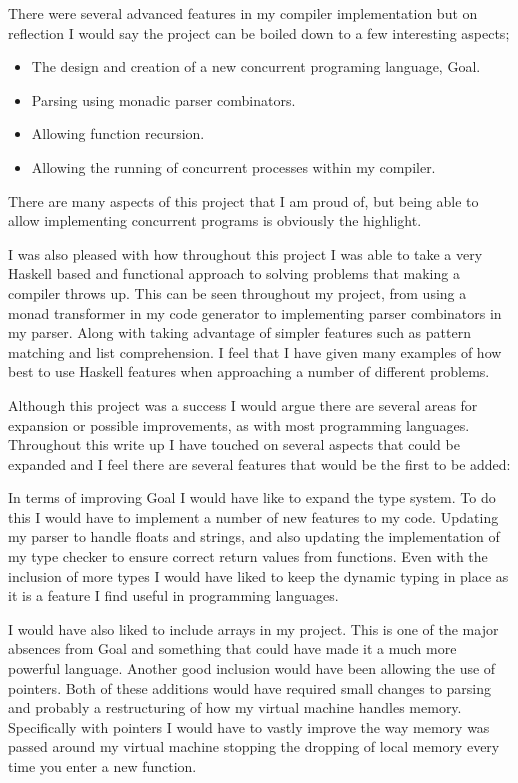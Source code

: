 There were several advanced features in my compiler implementation but on reflection I would say the project can be boiled down to a few interesting aspects;

\begin{itemize}
\item The design and creation of a new concurrent programing language, Goal.
\item Parsing using monadic parser combinators.
\item Allowing function recursion. 
\item Allowing the running of concurrent processes within my compiler.
\end{itemize}

There are many aspects of this project that I am proud of, but being able to allow implementing concurrent programs is obviously the highlight. 

I was also pleased with how throughout this project I was able to take a very Haskell based and functional approach to solving problems that making a compiler throws up. This can be seen throughout my project, from using a monad transformer in my code generator to implementing parser combinators in my parser. Along with taking advantage of simpler features such as pattern matching and list comprehension. I feel that I have given many examples of how best to use Haskell features when approaching a number of different problems. 

Although this project was a success I would argue there are several areas for expansion or possible improvements, as with most programming languages. Throughout this write up I have touched on several aspects that could be expanded and I feel there are several features that would be the first to be added:

In terms of improving Goal I would have like to expand the type system. To do this I would have to implement a number of new features to my code. Updating my parser to handle floats and strings, and also updating the implementation of my type checker to ensure correct return values from functions. Even with the inclusion of more types I would have liked to keep the dynamic typing in place as it is a feature I find useful in programming languages.

I would have also liked to include arrays in my project. This is one of the major absences from Goal and something that could have made it a much more powerful language. Another good inclusion would have been allowing the use of pointers. Both of these additions would have required small changes to parsing and probably a restructuring of how my virtual machine handles memory. Specifically with pointers I would have to vastly improve the way memory was passed around my virtual machine stopping the dropping of local memory every time you enter a new function.   

